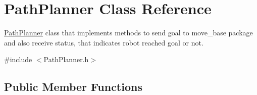 \hypertarget{classPathPlanner}{}\section{Path\+Planner Class Reference}
\label{classPathPlanner}


\hyperlink{classPathPlanner}{Path\+Planner} class that implements methods to send goal to move\+\_\+base package and also receive status, that indicates robot reached goal or not.  




{\ttfamily \#include $<$Path\+Planner.\+h$>$}

\subsection*{Public Member Functions}
